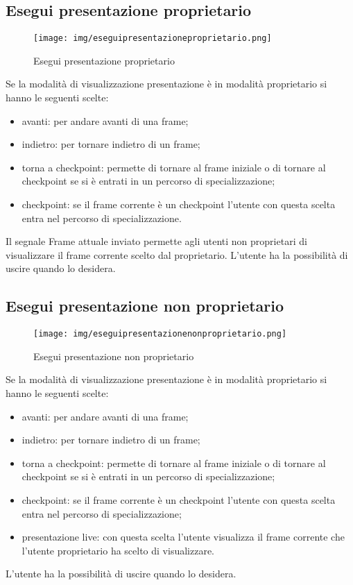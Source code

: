 \subsection{Esegui presentazione proprietario}

\begin{figure}[h!]
		\centering
		\texttt{[image: img/eseguipresentazioneproprietario.png]}
		\caption{Esegui presentazione proprietario}
		\label{fig:ModelloSpy}
\end{figure}

Se la modalità di visualizzazione presentazione è in modalità proprietario si hanno le seguenti scelte: 
\begin{itemize}
\item
avanti: per andare avanti di una frame; 
\item 
indietro: per tornare indietro di un frame;
\item torna a checkpoint: permette di tornare al frame iniziale o di tornare al checkpoint se si è entrati in un percorso di specializzazione; 
\item checkpoint: se il frame corrente è un checkpoint l'utente con questa scelta entra nel percorso di specializzazione.
\end{itemize}
Il segnale Frame attuale inviato permette agli utenti non proprietari di visualizzare il frame corrente scelto dal proprietario.
L'utente ha la possibilità di uscire quando lo desidera.

\subsection{Esegui presentazione non proprietario}

\begin{figure}[h!]
		\centering
		\texttt{[image: img/eseguipresentazionenonproprietario.png]}
		\caption{Esegui presentazione non proprietario}
		\label{fig:ModelloSpy}
\end{figure}

Se la modalità di visualizzazione presentazione è in modalità proprietario si hanno le seguenti scelte: 
\begin{itemize}
\item
avanti: per andare avanti di una frame; 
\item 
indietro: per tornare indietro di un frame;
\item torna a checkpoint: permette di tornare al frame iniziale o di tornare al checkpoint se si è entrati in un percorso di specializzazione; 
\item checkpoint: se il frame corrente è un checkpoint l'utente con questa scelta entra nel percorso di specializzazione;
\item presentazione live: con questa scelta l'utente visualizza il frame corrente che l'utente proprietario ha scelto di visualizzare.
\end{itemize}
L'utente ha la possibilità di uscire quando lo desidera.

